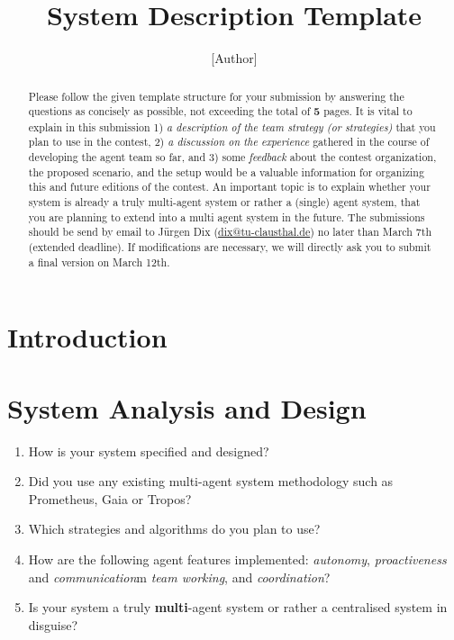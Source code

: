 \documentclass{llncs}
\begin{document}
\title{System Description Template}
\author{[Author]}
\institute{[Institute]}
 \maketitle
\begin{abstract}
Please follow the given template structure for your submission by
answering the questions as concisely as possible, not exceeding the
total of \textbf{5} pages. It is vital to explain in this submission
1) \textit{a description of the team strategy (or strategies)} that
you plan to use in the contest, 2) \textit{a discussion on the
experience} gathered in the course of developing the agent team so
far, and 3) some \textit{feedback} about the contest organization,
the proposed scenario, and the setup would be a valuable information
for organizing this and future editions of the contest. An important
topic is to explain whether your system is already a truly
multi-agent system or rather a (single) agent system, that you are
planning to extend into a multi agent system in the future. The
submissions should be send by email to J\"urgen Dix 
(\url{dix@tu-clausthal.de}) no later
than March 7th (extended deadline). If modifications are necessary,
we will directly ask you to submit a final version on March 12th.
\end{abstract}


\section{Introduction}

\section{System Analysis and Design}

\begin{enumerate}
  \item How is your system  specified and designed?
  \item Did you use any existing multi-agent system
  methodology such as Prometheus, Gaia or Tropos?
  \item Which strategies and algorithms do you plan to use?
  \item How are the following agent features implemented:
  \emph{autonomy}, \emph{proactiveness}
  and \emph{communication}m \emph{team working}, and \emph{coordination}?
  \item Is your system a truly \textbf{multi}-agent system or
  rather a centralised system in disguise?
\end{enumerate}
\end{document}
